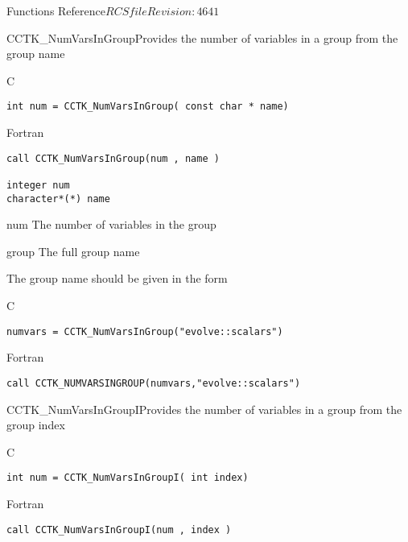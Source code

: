 \begin{cactuspart}{ Functions Reference}{$RCSfile$}{$Revision: 4641 $}
\begin{FunctionDescription}{CCTK\_NumVarsInGroup}{Provides the number of variables in a group from the group name}
\label{CCTK-NumVarsInGroup}
\begin{SynopsisSection}
\begin{Synopsis}{C}
\begin{verbatim}int num = CCTK_NumVarsInGroup( const char * name)\end{verbatim}
\end{Synopsis}
\begin{Synopsis}{Fortran}
\begin{verbatim}call CCTK_NumVarsInGroup(num , name )

integer num
character*(*) name\end{verbatim}
\end{Synopsis}
\end{SynopsisSection}
\begin{ParameterSection}
\begin{Parameter}{num}
The number of variables in the group
\end{Parameter}
\begin{Parameter}{group}
The full group name
\end{Parameter}
\end{ParameterSection}
\begin{Discussion}
The group name should be given in the form 
\end{Discussion}
\begin{ExampleSection}
\begin{Example}{C}
\begin{verbatim}
numvars = CCTK_NumVarsInGroup("evolve::scalars")
\end{verbatim}
\end{Example}
\begin{Example}{Fortran}
\begin{verbatim}
call CCTK_NUMVARSINGROUP(numvars,"evolve::scalars")
\end{verbatim}
\end{Example}
\end{ExampleSection}
\end{FunctionDescription}



\begin{FunctionDescription}{CCTK\_NumVarsInGroupI}{Provides the number of variables in a group from the group index}
\label{CCTK-NumVarsInGroupI}
\begin{SynopsisSection}
\begin{Synopsis}{C}
\begin{verbatim}int num = CCTK_NumVarsInGroupI( int index)\end{verbatim}
\end{Synopsis}
\begin{Synopsis}{Fortran}
\begin{verbatim}call CCTK_NumVarsInGroupI(num , index )


\end{verbatim}
\end{Synopsis}
\end{SynopsisSection}
\end{FunctionDescription}
\end{cactuspart}
